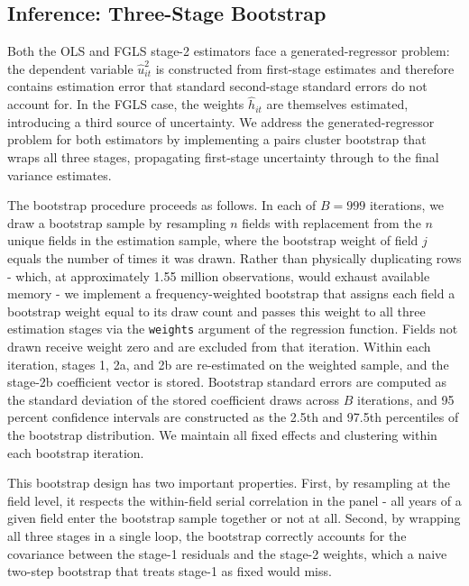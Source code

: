 \documentclass[12pt,letterpaper]{article}
\theoremstyle{remark}
\theoremstyle{remark}
\theoremstyle{plain}
\theoremstyle{definition}
\begin{document}
\subsection{\label{subsec:bootstrap}Inference: Three-Stage Bootstrap}

Both the OLS and FGLS stage-2 estimators face a generated-regressor problem: the dependent variable $\hat{u}_{it}^2$ is constructed from first-stage estimates and therefore contains estimation error that standard second-stage standard errors do not account for. In the FGLS case, the weights $\hat{h}_{it}$ are themselves estimated, introducing a third source of uncertainty. We address the generated-regressor problem for both estimators by implementing a pairs cluster bootstrap that wraps all three stages, propagating first-stage uncertainty through to the final variance estimates.

The bootstrap procedure proceeds as follows. In each of $B = 999$ iterations, we draw a bootstrap sample by resampling $n$ fields with replacement from the $n$ unique fields in the estimation sample, where the bootstrap weight of field $j$ equals the number of times it was drawn. Rather than physically duplicating rows - which, at approximately 1.55 million observations, would exhaust available memory - we implement a frequency-weighted bootstrap that assigns each field a bootstrap weight equal to its draw count and passes this weight to all three estimation stages via the \texttt{weights} argument of the regression function. Fields not drawn receive weight zero and are excluded from that iteration. Within each iteration, stages 1, 2a, and 2b are re-estimated on the weighted sample, and the stage-2b coefficient vector is stored. Bootstrap standard errors are computed as the standard deviation of the stored coefficient draws across $B$ iterations, and 95 percent confidence intervals are constructed as the 2.5th and 97.5th percentiles of the bootstrap distribution. We maintain all fixed effects and clustering within each bootstrap iteration.

This bootstrap design has two important properties. First, by resampling at the field level, it respects the within-field serial correlation in the panel - all years of a given field enter the bootstrap sample together or not at all. Second, by wrapping all
three stages in a single loop, the bootstrap correctly accounts for the covariance between the stage-1 residuals and the stage-2 weights, which a naive two-step bootstrap that treats stage-1 as fixed would miss.
\end{document}
